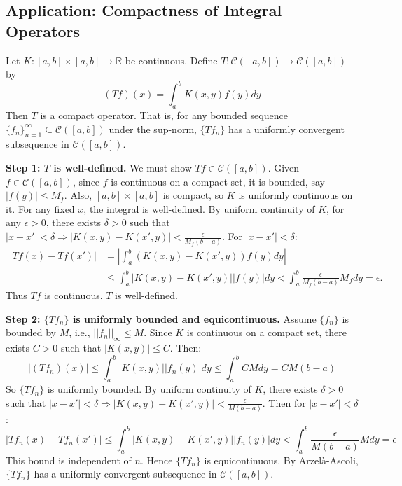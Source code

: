 \subsection*{Application: Compactness of Integral Operators}
Let $K: [a,b] \times [a,b] \rightarrow \mathbb{R}$ be continuous. Define $T: \mathcal{C}([a,b]) \rightarrow \mathcal{C}([a,b])$ by
$$ (Tf)(x) = \displaystyle\int_a^b K(x,y)f(y) dy $$
Then $T$ is a compact operator. That is, for any bounded sequence $\{f_n\}_{n=1}^\infty \subseteq \mathcal{C}([a,b])$ under the sup-norm, $\{Tf_n\}$ has a uniformly convergent subsequence in $\mathcal{C}([a,b])$.

\begin{pfbox}
\textbf{Step 1: $T$ is well-defined.}
We must show $Tf \in \mathcal{C}([a,b])$. Given $f \in \mathcal{C}([a,b])$, since $f$ is continuous on a compact set, it is bounded, say $|f(y)| \le M_f$. Also, $[a,b] \times [a,b]$ is compact, so $K$ is uniformly continuous on it. 
For any fixed $x$, the integral is well-defined. By uniform continuity of $K$, for any $\epsilon > 0$, there exists $\delta > 0$ such that $|x - x'| < \delta \Rightarrow |K(x,y) - K(x',y)| < \frac{\epsilon}{M_f(b-a)}$.
For $|x - x'| < \delta$:
\begin{align*}
|Tf(x) - Tf(x')| &= \left| \displaystyle\int_a^b (K(x,y) - K(x',y))f(y) dy \right|\\ 
                 & \le \displaystyle\int_a^b |K(x,y) - K(x',y)||f(y)| dy < \displaystyle\int_a^b \frac{\epsilon}{M_f(b-a)} M_f dy = \epsilon.
\end{align*}
Thus $Tf$ is continuous. $T$ is well-defined.

\textbf{Step 2: $\{Tf_n\}$ is uniformly bounded and equicontinuous.}
Assume $\{f_n\}$ is bounded by $M$, i.e., $||f_n||_\infty \le M$.
Since $K$ is continuous on a compact set, there exists $C > 0$ such that $|K(x,y)| \le C$. Then:
$$|(Tf_n)(x)| \le \displaystyle\int_a^b |K(x,y)||f_n(y)| dy \le \displaystyle\int_a^b CM dy = CM(b-a)$$
So $\{Tf_n\}$ is uniformly bounded.
By uniform continuity of $K$, there exists $\delta > 0$ such that $|x - x'| < \delta \Rightarrow |K(x,y) - K(x',y)| < \frac{\epsilon}{M(b-a)}$.
Then for $|x - x'| < \delta$:
$$|Tf_n(x) - Tf_n(x')| \le \displaystyle\int_a^b |K(x,y) - K(x',y)||f_n(y)| dy < \displaystyle\int_a^b \frac{\epsilon}{M(b-a)} M dy = \epsilon$$
This bound is independent of $n$. Hence $\{Tf_n\}$ is equicontinuous.
By Arzelà-Ascoli, $\{Tf_n\}$ has a uniformly convergent subsequence in $\mathcal{C}([a,b])$.
\end{pfbox}




